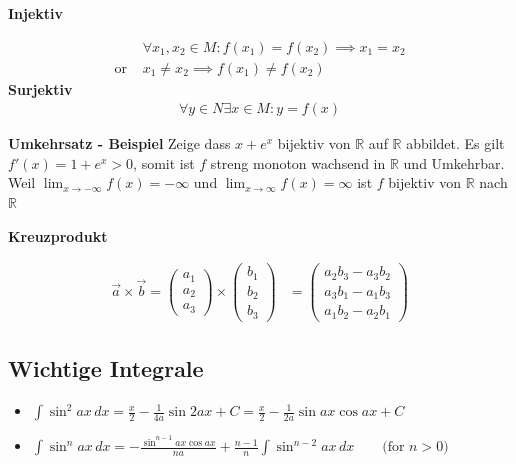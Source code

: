 \documentclass[25pt]{sciposter}
\newcommand{\R}{\mathbb{R}}
\newenvironment{method}[1]{\begin{mdframed}[backgroundcolor=blue!10,innertopmargin=15pt, innerbottommargin=15pt, nobreak=true]
		\textbf{#1 }
	}
	{ 
	\end{mdframed}
}
\begin{document}
\begin{multicols}{3}
\begin{method}{Injektiv}
	\begin{align*}
	&\forall x_1,x_2 \in M : f(x_1) = f(x_2) \implies x_1 = x_2\\
	\text{or }  &x_1 \not = x_2 \implies f(x_1) \not = f(x_2)
	\end{align*}
	\textbf{Surjektiv}
	\begin{align*}
	\forall y \in N \exists x \in M : y = f(x)
	\end{align*}
\end{method}

\textbf{Umkehrsatz - Beispiel} Zeige dass $x + e^x$ bijektiv von $\R$ auf $\R$ abbildet. Es gilt $f'(x) = 1 + e^x > 0$, somit ist $f$ streng monoton wachsend in $\R$ und Umkehrbar. Weil $\lim_{x \to -\infty} f(x) = - \infty$ und $\lim_{x \to \infty} f(x) = \infty$ ist $f$ bijektiv von $\R$ nach $\R$



\begin{method}{Kreuzprodukt}
	\begin{align*}
	\vec{a}\times\vec{b}=	\begin{pmatrix}a_1 \\ a_2 \\ a_3\end{pmatrix}
	\times
	\begin{pmatrix}b_1 \\ b_2 \\ b_3 \end{pmatrix} &=	\begin{pmatrix}
	a_2b_3 - a_3b_2 \\
	a_3b_1 - a_1b_3 \\
	a_1b_2 - a_2b_1
	\end{pmatrix}
	\end{align*}
\end{method}



\subsection*{Wichtige Integrale}

\begin{itemize}	
	
	\item ${\displaystyle \int \sin ^{2}{ax}\,dx={\frac {x}{2}}-{\frac {1}{4a}}\sin 2ax+C={\frac {x}{2}}-{\frac {1}{2a}}\sin ax\cos ax+C}$
	
	\item ${\displaystyle \int \sin ^{n}{ax}\,dx=-{\frac {\sin ^{n-1}ax\cos ax}{na}}+{\frac {n-1}{n}}\int \sin ^{n-2}ax\,dx\qquad {\mbox{(for }}n>0{\mbox{)}}}$
	

\end{itemize}
\end{multicols}
\end{document}
